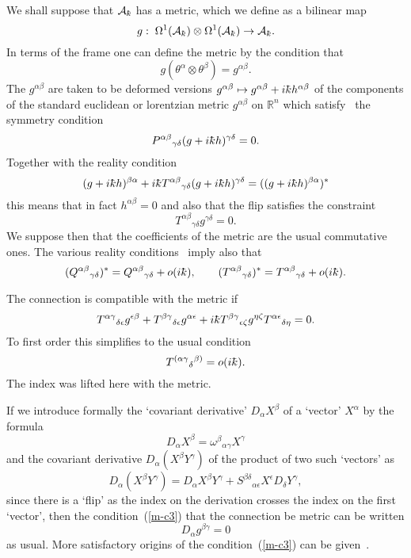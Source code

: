 \documentclass[12pt,a4paper]{article}
\newcounter{eg}
\def\b#1{{\mathbb #1}}
\def\c#1{{\cal #1}}
\def\kbar{{\mathchar'26\mkern-9muk}}
\def\cn#1{\cite{#1}}
\begin{document}
We shall suppose that $\c{A}_\kbar$ has a metric, which we define as a
bilinear map 
\begin{equation}
g:\; \Omega^1(\c{A}_\kbar) \otimes \Omega^1(\c{A}_\kbar) 
\rightarrow \c{A}_\kbar.                                        \label{metric} 
\end{equation} 
In terms of the frame one can define the metric by the condition that
\begin{equation}
g(\theta^\alpha \otimes \theta^\beta)= g^{\alpha\beta}.          \label{f-m}
\end{equation}
The $g^{\alpha\beta}$ are taken to be deformed versions 
$g^{\alpha\beta} \mapsto g^{\alpha\beta} + i \kbar h^{\alpha\beta}$
of the components of the standard euclidean or lorentzian metric
$g^{\alpha\beta}$ on $\b{R}^n$ which satisfy~\cn{FioMad98a} the
symmetry condition
\begin{equation}
P^{\alpha\beta}{}_{\gamma\delta} (g+i\kbar h)^{\gamma\delta} = 0.   
                                                             \label{symmet}
\end{equation}
Together with the reality condition
$$
(g+i\kbar h)^{\beta\alpha} + i\kbar T^{\alpha\beta}{}_{\gamma\delta}
(g+i\kbar h)^{\gamma\delta} = ((g+i\kbar h)^{\beta\alpha})^*
$$
this means that in fact $h^{\alpha\beta} = 0$ and also that the flip
satisfies the constraint
$$
T^{\alpha\beta}{}_{\gamma\delta}g^{\gamma\delta} = 0.
$$
We suppose then that the coefficients of the metric are the usual
commutative ones. The various reality
conditions~\cite{Con95,FioMad98a} imply also that
$$
(Q^{\alpha\beta}{}_{\gamma\delta})^* =
Q^{\alpha\beta}{}_{\gamma\delta} + o(i\kbar), \qquad
(T^{\alpha\beta}{}_{\gamma\delta})^* =
T^{\alpha\beta}{}_{\gamma\delta} + o(i\kbar).
$$

The connection is compatible with the metric if
\begin{equation}
T^{\alpha\gamma}{}_{\delta\epsilon} g^{\epsilon\beta} +
T^{\beta\gamma}{}_{\delta\epsilon} g^{\alpha\epsilon} +
i\kbar T^{\beta\gamma}{}_{\epsilon\zeta} g^{\eta\zeta}
T^{\alpha\epsilon}{}_{\delta\eta} = 0.                          \label{m-c3}
\end{equation}
To first order this simplifies to the usual condition
\begin{equation}
T^{(\alpha\gamma}{}_{\delta}{}^{\beta)} = o(i\kbar).            \label{m-c2}
\end{equation}
The index was lifted here with the metric.  

If we introduce formally the `covariant derivative' $D_\alpha X^\beta$
of a `vector' $X^\alpha$ by the formula
$$
D_\alpha X^\beta = \omega^\beta{}_{\alpha\gamma} X^\gamma
$$
and the covariant derivative $D_\alpha (X^\beta Y^\gamma)$ of the
product of two such `vectors' as
$$
D_\alpha (X^\beta Y^\gamma) = D_\alpha X^\beta Y^\gamma + 
S^{\beta\delta}{}_{\alpha\epsilon} X^\epsilon D_\delta Y^\gamma,
$$
since there is a `flip' as the index on the derivation crosses the
index on the first `vector', then the condition~(\ref{m-c3}) that the
connection be metric can be written
$$
D_\alpha g^{\beta\gamma} = 0
$$
as usual. More satisfactory origins of the condition~(\ref{m-c3})
can be given~\cite{DubMadMasMou95}.
\end{document}

